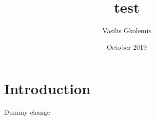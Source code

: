\documentclass{article}
\title{test}
\author{Vasilis Gkolemis}
\date{October 2019}
\begin{document}
\maketitle

\section{Introduction}

Dummy change
\end{document}
